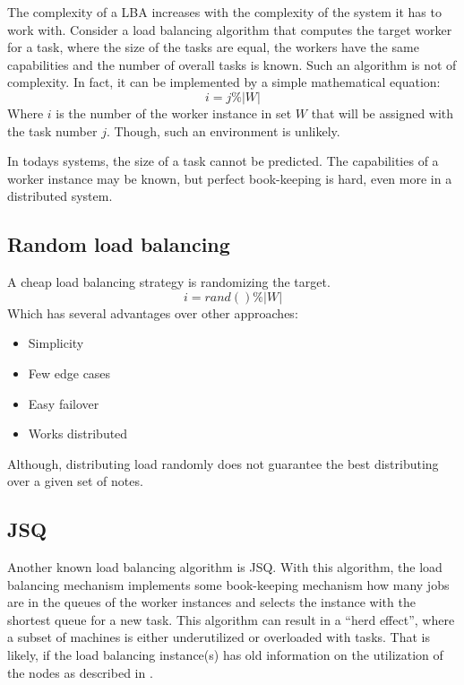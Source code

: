 The complexity of a \ac{LBA} increases with the complexity of the system it has
to work with.
Consider a load balancing algorithm that computes the target worker for a task,
where the size of the tasks are equal, the workers have the same capabilities
and the number of overall tasks is known.
Such an algorithm is not of complexity.
In fact, it can be implemented by a simple mathematical equation:
\begin{equation}
    i = j \% |W|
\end{equation}
Where $i$ is the number of the worker instance in set $W$ that will be assigned
with the task number $j$.
Though, such an environment is unlikely.

In todays systems, the size of a task cannot be predicted.
The capabilities of a worker instance may be known, but perfect book-keeping is
hard, even more in a distributed system.

\subsection{Random load balancing}

A cheap load balancing strategy is randomizing the target.
\begin{equation}
    i = rand() \% |W|
\end{equation}
Which has several advantages over other approaches:
\begin{itemize}
    \item Simplicity
    \item Few edge cases
    \item Easy failover
    \item Works distributed
\end{itemize} %
Although, distributing load randomly does not guarantee the best distributing
over a given set of notes.

\subsection{\ac{JSQ}}

Another known load balancing algorithm is \ac{JSQ}.
With this algorithm, the load balancing mechanism implements some book-keeping
mechanism how many jobs are in the queues of the worker instances and selects
the instance with the shortest queue for a new task.
This algorithm can result in a ``herd effect'', where a subset of machines is
either underutilized or overloaded with tasks.
That is likely, if the load balancing instance(s) has old information on the
utilization of the nodes as described in \cite{inpSLoadInfo}.

